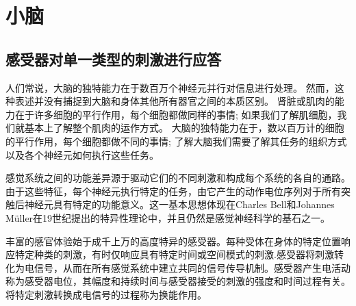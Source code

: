 \chapter{小脑}


\section{感受器对单一类型的刺激进行应答}
人们常说，大脑的独特能力在于数百万个神经元并行对信息进行处理。
然而，这种表述并没有捕捉到大脑和身体其他所有器官之间的本质区别。
肾脏或肌肉的能力在于许多细胞的平行作用，每个细胞都做同样的事情; 
如果我们了解肌细胞，我们就基本上了解整个肌肉的运作方式。
大脑的独特能力在于，数以百万计的细胞的平行作用，每个细胞都做不同的事情; 
了解大脑我们需要了解其任务的组织方式以及各个神经元如何执行这些任务。

感觉系统之间的功能差异源于驱动它们的不同刺激和构成每个系统的各自的通路。由于这些特征，每个神经元执行特定的任务，由它产生的动作电位序列对于所有突触后神经元具有特定的功能意义。这一基本思想体现在Charles Bell和Johannes Müller在19世纪提出的特异性理论中，并且仍然是感觉神经科学的基石之一。

丰富的感官体验始于成千上万的高度特异的感受器。每种受体在身体的特定位置响应特定种类的刺激，有时仅响应具有特定时间或空间模式的刺激.感受器将刺激转化为电信号，从而在所有感觉系统中建立共同的信号传导机制。感受器产生电活动称为感受器电位，其幅度和持续时间与感受器接受的刺激的强度和时间过程有关。将特定刺激转换成电信号的过程称为换能作用。

